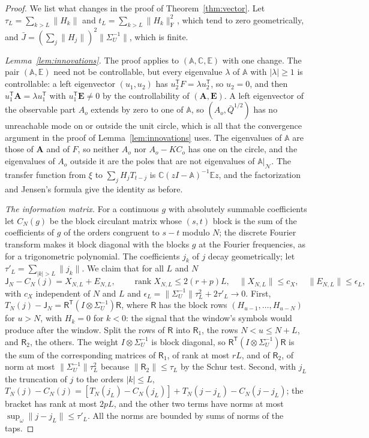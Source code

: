 \documentclass[11pt,onecolumn]{IEEEtran}
\newcommand{\bA}{\mathbf A}
\newcommand{\bE}{\mathbf E}
\begin{document}
\begin{proof}
We list what changes in the proof of Theorem~\ref{thm:vector}. Let
$\tau_L=\sum_{k>L}\|H_k\|$ and $t_L=\sum_{k>L}\|H_k\|_{\mathrm F}^2$, which
tend to zero geometrically, and $\bar J=(\sum_j\|H_j\|)^2\|\Sigma_U^{-1}\|$,
which is finite.

\emph{Lemma~\ref{lem:innovations}.} The proof applies to
$(\mathbb A,\mathbb C,\mathbb E)$ with one change. The pair
$(\mathbb A,\mathbb E)$ need not be controllable, but every eigenvalue
$\lambda$ of $\mathbb A$ with $|\lambda|\ge1$ is controllable: a left
eigenvector $(u_1,u_2)$ has $u_2^{\mathsf T}F=\lambda u_2^{\mathsf T}$, so
$u_2=0$, and then $u_1^{\mathsf T}\bA=\lambda u_1^{\mathsf T}$ with
$u_1^{\mathsf T}\bE\ne0$ by the controllability of $(\bA,\bE)$. A left
eigenvector of the observable part $A_o$ extends by zero to one of
$\mathbb A$, so $(A_o,\bar Q^{1/2})$ has no unreachable mode on or outside
the unit circle, which is all that the convergence argument in the
proof of Lemma~\ref{lem:innovations} uses. The eigenvalues of $\mathbb A$ are those
of $\bA$ and of $F$, so neither $A_o$ nor $A_o-KC_o$ has one on the
circle, and the eigenvalues of $A_o$ outside it are the poles that are
not eigenvalues of $\mathbb A|_{\mathcal N}$. The transfer function from
$\xi$ to $\sum_jH_jT_{t-j}$ is $\mathbb C(zI-\mathbb A)^{-1}\mathbb Ez$, and the
factorization and Jensen's formula give the identity as before.

\emph{The information matrix.} For a continuous $g$ with absolutely
summable coefficients let $C_N(g)$ be the block circulant matrix whose
$(s,t)$ block is the sum of the coefficients of $g$ of the orders
congruent to $s-t$ modulo $N$; the discrete Fourier transform makes it
block diagonal with the blocks $g$ at the Fourier frequencies, as for a
trigonometric polynomial. The coefficients $j_k$ of $j$ decay
geometrically; let $\tau'_L=\sum_{|k|>L}\|j_k\|$. We claim that for all
$L$ and $N$
\begin{equation}
\mathsf J_N-C_N(j)=X_{N,L}+E_{N,L},\qquad\operatorname{rank}X_{N,L}\le2(r+p)L,\quad
\|X_{N,L}\|\le c_X,\quad\|E_{N,L}\|\le\epsilon_L,
\label{eq:iirsplit}
\end{equation}
with $c_X$ independent of $N$ and $L$ and
$\epsilon_L=\|\Sigma_U^{-1}\|\tau_L^2+2\tau'_L\to0$. First,
$T_N(j)-\mathsf J_N=\mathsf R^{\mathsf T}(I\otimes\Sigma_U^{-1})\mathsf R$, where
$\mathsf R$ has the block rows $(H_{u-1},\dots,H_{u-N})$ for $u>N$, with
$H_k=0$ for $k<0$: the signal that the window's symbols would produce
after the window. Split the rows of $\mathsf R$ into $\mathsf R_1$, the
rows $N<u\le N+L$, and $\mathsf R_2$, the others. The weight
$I\otimes\Sigma_U^{-1}$ is block diagonal, so
$\mathsf R^{\mathsf T}(I\otimes\Sigma_U^{-1})\mathsf R$ is the sum of the
corresponding matrices of $\mathsf R_1$, of rank at most $rL$, and of
$\mathsf R_2$, of norm at most $\|\Sigma_U^{-1}\|\tau_L^2$ because
$\|\mathsf R_2\|\le\tau_L$ by the Schur test. Second,
with $j_L$ the truncation of $j$ to the orders $|k|\le L$,
$T_N(j)-C_N(j)=[T_N(j_L)-C_N(j_L)]+T_N(j-j_L)-C_N(j-j_L)$; the bracket has
rank at most $2pL$, and the other two terms have norms at most
$\sup_\omega\|j-j_L\|\le\tau'_L$. All the norms are bounded by sums of
norms of the taps.


\end{proof}
\end{document}
